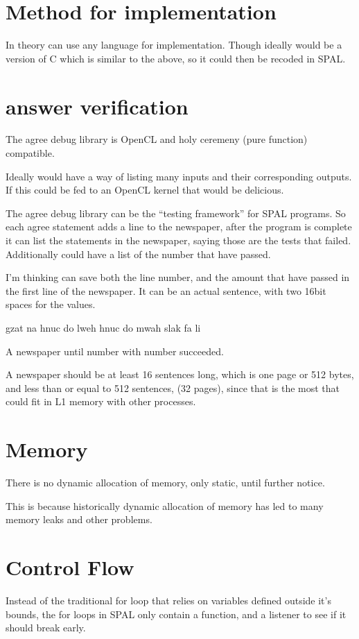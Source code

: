 \section{Method for implementation}
In theory can use any language for implementation.  
Though ideally would be a version of C which is similar to the above, 
so it could then be recoded in SPAL.\@

\section{answer verification}

The agree debug library is OpenCL and holy ceremeny (pure function) compatible. 

Ideally would have a way of listing many inputs and their corresponding outputs. 
If this could be fed to an OpenCL kernel that would be delicious. 

The agree debug library can be the ``testing framework'' for SPAL programs. 
So each agree statement adds a line to the newspaper,
after the program is complete it can list the statements in the newspaper,
saying those are the tests that failed. 
Additionally could have a list of the number that have passed.

I'm thinking can save both the line number, and the amount that have passed in
the first line of the newspaper. It can be an actual sentence, with two 16bit
spaces for the values.\ 

gzat na hnuc do lweh hnuc do mwah slak fa li

A newspaper until number with number succeeded.

A newspaper should be at least 16 sentences long, which is one page or 512
bytes, and less than or equal to 512 sentences, (32 pages), since that is the
most that could  fit in L1 memory with other processes. 


\section{Memory}

There is no dynamic allocation of memory, only static, until further notice.

This is because historically dynamic allocation of memory has led to many memory
leaks and other problems. 

\section{Control Flow}
Instead of the traditional for loop that relies on variables defined outside
it's bounds, the for loops in SPAL only contain a function, and a listener to
see if it should break early. 

